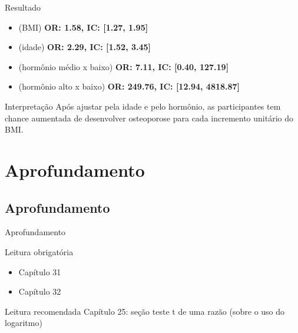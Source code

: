 \documentclass{beamer}
\begin{document}
\begin{frame}{\scriptsize }
  \begin{block}{Resultado}
    \footnotesize
    \begin{itemize}
      \scriptsize
    \item {\small (BMI)} {\bf OR: 1.58, IC: [1.27, 1.95]}
      \medskip
    \item {\small (idade)} {\bf OR: 2.29, IC: [1.52, 3.45]}
      \medskip
    \item {\small (hormônio médio x baixo)} {\bf OR: 7.11, IC: [0.40, 127.19]}
      \medskip
    \item {\small (hormônio alto x baixo)} {\bf OR: 249.76, IC: [12.94, 4818.87]}
    \end{itemize}
  \end{block}
    \begin{block}{Interpretação}
    \footnotesize
    Após ajustar pela idade e pelo hormônio, as participantes tem chance aumentada de desenvolver osteoporose para cada incremento unitário do BMI.
  \end{block}
\end{frame}

\section{Aprofundamento}

\subsection{Aprofundamento}

\begin{frame}{\scriptsize Aprofundamento}
  \begin{block}{Leitura obrigatória}
    \begin{itemize}
      \footnotesize
    \item Capítulo 31
    \item Capítulo 32
    \end{itemize}
  \end{block}
  \begin{block}{Leitura recomendada}
    \scriptsize
    Capítulo 25: seção teste t de uma razão ({\tiny sobre o uso do logaritmo})


  \end{block}
\end{frame}
\end{document}
